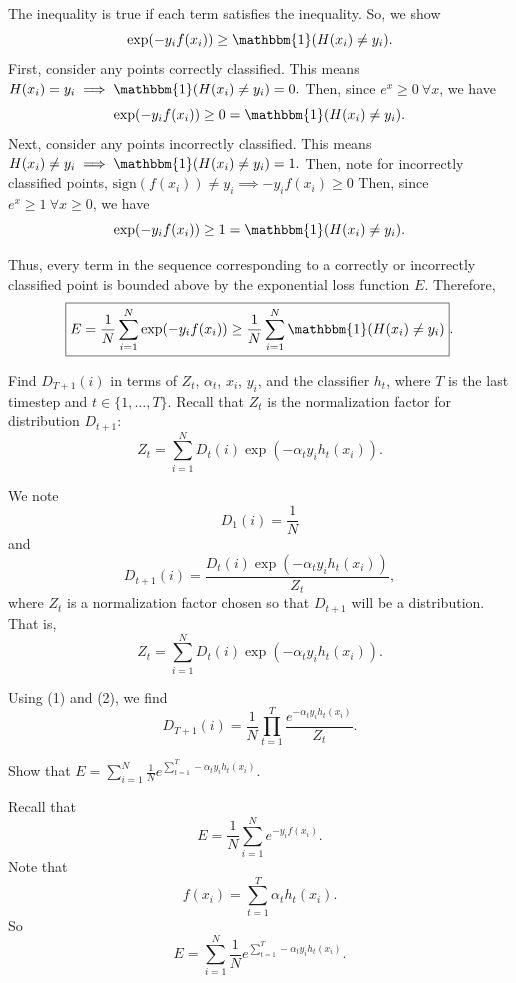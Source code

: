 \begin{solution}
	The inequality is true if each term satisfies the inequality. So, we show 
	\[ 
	\exp(-y_i f(x_i)) \geq \mathbbm{1}(H(x_i) \neq y_i).
	\]
	First, consider any points correctly classified. This means $H(x_i) = y_i \implies \mathbbm{1}(H(x_i) \neq y_i) = 0.$ Then, since $e^x \geq  0 \ \forall x$, we have
	\[
	\exp(-y_i f(x_i)) \geq 0 = \mathbbm{1}(H(x_i) \neq y_i).
	\]
	Next, consider any points incorrectly classified. This means $H(x_i) \neq y_i \implies \mathbbm{1}(H(x_i) \neq y_i) = 1.$ Then, note for incorrectly classified points, $\text{sign}(f(x_i)) \neq y_i \implies -y_i f(x_i) \geq 0$ Then, since $e^x \geq 1 \ \forall x \geq 0$, we have
	\[
	\exp(-y_i f(x_i)) \geq 1 = \mathbbm{1}(H(x_i) \neq y_i).
	\]
	
	Thus, every term in the sequence corresponding to a correctly or incorrectly classified point is bounded above by the exponential loss function $E$. Therefore,
	\[
	\boxed{E = \frac{1}{N}\sum_{i=1}^N \exp(-y_i f(x_i)) \geq \frac{1}{N} \sum_{i=1}^N
		\mathbbm{1}(H(x_i) \neq y_i)}.
	\]
\end{solution}

\problem[3]
Find $D_{T + 1}(i)$ in terms of $Z_t$, $\alpha_t$, $x_i$, $y_i$, and the classifier $h_t$, where $T$ is the last timestep and $t \in \{1, \ldots, T\}$. Recall that $Z_t$ is the normalization factor for distribution $D_{t+1}$:
$$Z_t = \sum\limits_{i=1}^N D_t(i) \exp(-\alpha_{t}y_{i}h_{t}(x_{i})).$$

\begin{solution}
	We note
	\[
	D_1(i) = \frac{1}{N} \tag{1}
	\] and
	\[
	D_{t+1}(i) = \frac{D_t(i)\exp(-\alpha_t y_i h_t(x_i))}{Z_t}, \tag{2}
	\] where $Z_t$ is a normalization factor chosen so that $D_{t+1}$ will be a distribution. That is,
	\[
	Z_t = \sum_{i=1}^N D_t(i) \exp(-\alpha_t y_i h_t(x_i)). 
	\]
	\par
	Using (1) and (2), we find
	\[
	\boxed{D_{T+1}(i) = \frac{1}{N} \prod_{t=1}^T\frac{e^{-\alpha_t y_i h_t(x_i)}}{Z_t}}.
	\]
\end{solution}

\problem[2]
Show that $E = \sum_{i=1}^N  \frac{1}{N} e^{\sum_{t=1}^T -\alpha_t y_i h_t(x_i)}.$

\begin{solution}
	Recall that \[E = \frac 1 N \sum_{i = 1}^N e^{- y_i f(x_i)}.\]
	Note that \[f(x_i) = \sum_{t = 1}^T \alpha_t h_t(x_i).\]
	So \[\boxed{E = \sum_{i=1}^N  \frac{1}{N} e^{\sum_{t=1}^T -\alpha_t y_i h_t(x_i)}}.\]
\end{solution}

